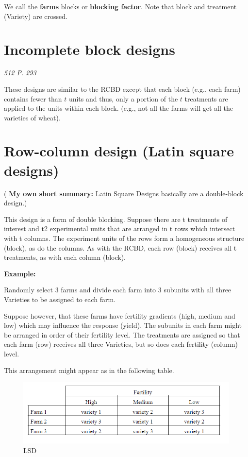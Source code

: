 \documentclass[]{book}
\begin{document}
We call the \textbf{farms} blocks or \textbf{blocking factor}. Note that block and treatment (Variety) are crossed.

\hypertarget{incomplete-block-designs}{%
\section{Incomplete block designs}\label{incomplete-block-designs}}

\emph{512 P. 293}

These designs are similar to the RCBD except that each block (e.g., each farm) contains fewer than \(t\) units and thus, only a portion of the \(t\) treatments are applied to the units within each block. (e.g., not all the farms will get all the varieties of wheat).

\hypertarget{row-column-design-latin-square-designs}{%
\section{Row-column design (Latin square designs)}\label{row-column-design-latin-square-designs}}

( \textbf{My own short summary:} Latin Square Designs basically are a double-block design.)

This design is a form of double blocking. Suppose there are t treatments of interest and t2 experimental units that are arranged in t rows which intersect with t columns. The experiment units of the rows form a homogeneous structure (block), as do the columns. As with the RCBD, each row (block) receives all t treatments, as with each column (block).

\textbf{Example:}

Randomly select 3 farms and divide each farm into 3 subunits with all three Varieties to be assigned to each farm.

Suppose however, that these farms have fertility gradients (high, medium and low) which may influence the response (yield). The subunits in each farm might be arranged in order of their fertility level. The treatments are assigned so that each farm (row) receives all three Varieties, but so does each fertility (column) level.

This arrangement might appear as in the following table.

\begin{figure}
\centering
\includegraphics{LSD.png}
\caption{LSD}
\end{figure}
\end{document}
